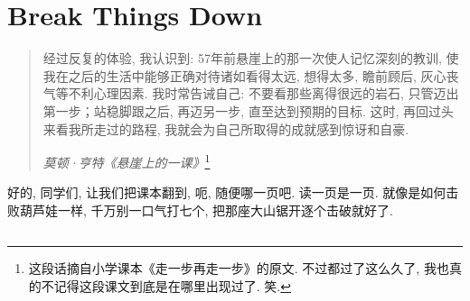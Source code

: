 \chapter{Break Things Down}

\begin{quotation}
  经过反复的体验, 我认识到: 57年前悬崖上的那一次使人记忆深刻的教训, 使我在之后的生活中能够正确对待诸如看得太远, 想得太多, 瞻前顾后, 灰心丧气等不利心理因素. 我时常告诫自己: 不要看那些离得很远的岩石, 只管迈出第一步；站稳脚跟之后, 再迈另一步, 直至达到预期的目标. 这时, 再回过头来看我所走过的路程, 我就会为自己所取得的成就感到惊讶和自豪. 

  \emph{莫顿·亨特《悬崖上的一课》}\footnote{这段话摘自小学课本《走一步再走一步》的原文. 不过都过了这么久了, 我也真的不记得这段课文到底是在哪里出现过了. 笑. }
\end{quotation}

好的, 同学们, 让我们把课本翻到, 呃, 随便哪一页吧. 读一页是一页. 就像是如何击败葫芦娃一样, 千万别一口气打七个, 把那座大山锯开逐个击破就好了. 

\section{}